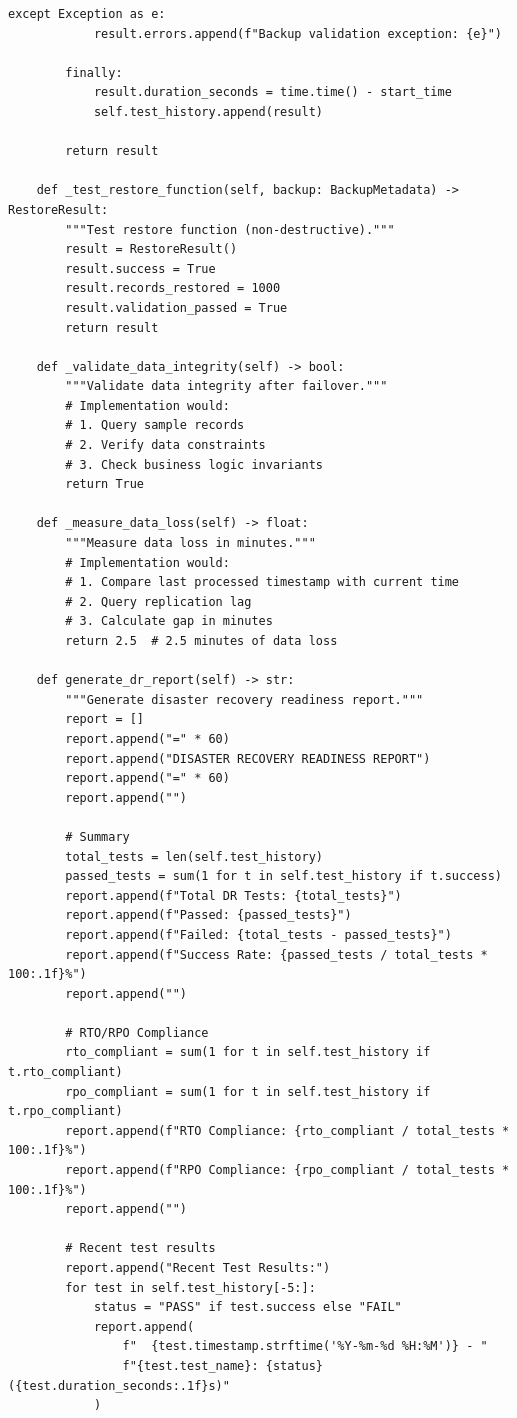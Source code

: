\begin{lstlisting}[style=python, caption={Disaster Recovery Testing Framework}]
        except Exception as e:
            result.errors.append(f"Backup validation exception: {e}")

        finally:
            result.duration_seconds = time.time() - start_time
            self.test_history.append(result)

        return result

    def _test_restore_function(self, backup: BackupMetadata) -> RestoreResult:
        """Test restore function (non-destructive)."""
        result = RestoreResult()
        result.success = True
        result.records_restored = 1000
        result.validation_passed = True
        return result

    def _validate_data_integrity(self) -> bool:
        """Validate data integrity after failover."""
        # Implementation would:
        # 1. Query sample records
        # 2. Verify data constraints
        # 3. Check business logic invariants
        return True

    def _measure_data_loss(self) -> float:
        """Measure data loss in minutes."""
        # Implementation would:
        # 1. Compare last processed timestamp with current time
        # 2. Query replication lag
        # 3. Calculate gap in minutes
        return 2.5  # 2.5 minutes of data loss

    def generate_dr_report(self) -> str:
        """Generate disaster recovery readiness report."""
        report = []
        report.append("=" * 60)
        report.append("DISASTER RECOVERY READINESS REPORT")
        report.append("=" * 60)
        report.append("")

        # Summary
        total_tests = len(self.test_history)
        passed_tests = sum(1 for t in self.test_history if t.success)
        report.append(f"Total DR Tests: {total_tests}")
        report.append(f"Passed: {passed_tests}")
        report.append(f"Failed: {total_tests - passed_tests}")
        report.append(f"Success Rate: {passed_tests / total_tests * 100:.1f}%")
        report.append("")

        # RTO/RPO Compliance
        rto_compliant = sum(1 for t in self.test_history if t.rto_compliant)
        rpo_compliant = sum(1 for t in self.test_history if t.rpo_compliant)
        report.append(f"RTO Compliance: {rto_compliant / total_tests * 100:.1f}%")
        report.append(f"RPO Compliance: {rpo_compliant / total_tests * 100:.1f}%")
        report.append("")

        # Recent test results
        report.append("Recent Test Results:")
        for test in self.test_history[-5:]:
            status = "PASS" if test.success else "FAIL"
            report.append(
                f"  {test.timestamp.strftime('%Y-%m-%d %H:%M')} - "
                f"{test.test_name}: {status} ({test.duration_seconds:.1f}s)"
            )


\end{lstlisting}
